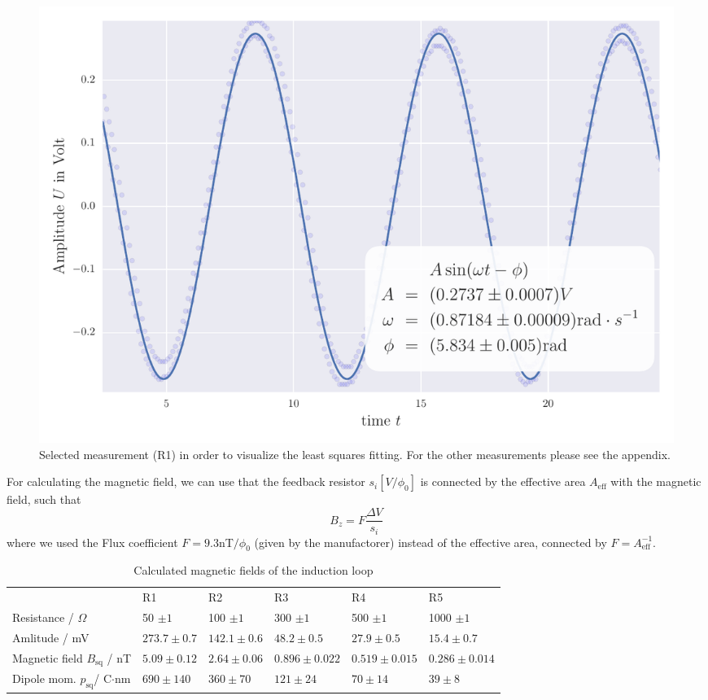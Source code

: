 \begin{figure}[H]
    \centering
    \includegraphics[width=1\linewidth]{analysis/figures/fit4_1}
    \caption{Selected measurement (R1) in order to visualize the least squares
    fitting. For the other measurements please see the appendix.}
    \label{fig:4_1_plot}
\end{figure}

For calculating the magnetic field, we can use \cite{ver} that
the feedback resistor $s_i [V/\phi_0]$ is connected by the effective area $A_{\mathrm{eff}}$
with the magnetic field, such that
\begin{equation}
B_z = F \frac{\Delta V}{s_i} 
\end{equation}
where we used the Flux coefficient $F = 9.3$nT$/\phi_0$ (given by the manufactorer) 
instead of the effective area, connected by $F = A_{\mathrm{eff}}^{-1}$.
\begin{table}[htb]
\caption{Calculated magnetic fields of the induction loop}
\begin{tabular}{ l| p{2.3cm}|p{2.3cm}|p{2.3cm}|p{2.3cm}|p{2.3cm}}
 \rowcolor{tabcolor}& R1 & R2 & R3 & R4 & R5 \\ 
Resistance / $\Omega$ & 50  $\pm 1$ & 100  $\pm 1$& 300  $\pm 1$& 500 $\pm 1$ & 1000 $\pm 1$\\  
Amlitude / mV &$273.7 \pm 0.7$&$142.1 \pm 0.6$&$48.2 \pm 0.5$&$27.9 \pm 0.5$&$15.4 \pm 0.7$\\
Magnetic field $B_{\mathrm{sq}}$ / nT &$5.09 \pm 0.12$&$2.64 \pm 0.06$&$0.896 \pm 0.022$&$0.519 \pm 0.015$&$0.286 \pm 0.014$\\  
Dipole mom. $p_{\mathrm{sq}}$/ C$\cdot$nm &$690 \pm 140$ & $360 \pm 70$ &$121 \pm 24$ & $70 \pm 14$ & $39 \pm 8$ \\
\end{tabular}
\end{table}

